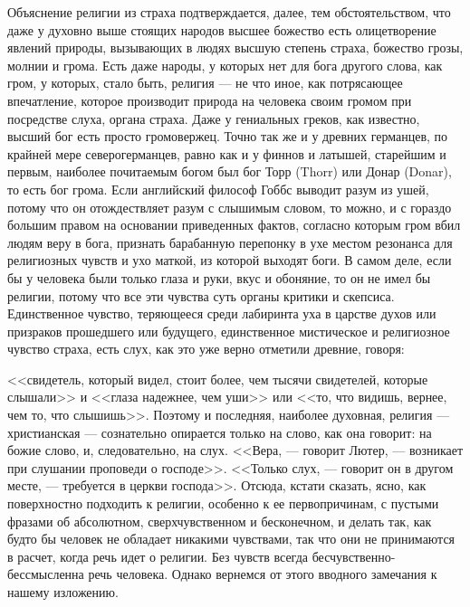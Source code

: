 \documentclass[12pt]{article}
\begin{document}
Объяснение религии из страха подтверждается, далее, тем обстоятельством, что даже у духовно выше стоящих народов высшее божество есть олицетворение явлений природы, вызывающих в людях высшую степень страха, божество грозы, молнии и грома. Есть даже народы, у которых нет для бога другого слова, как гром, у которых, стало быть, религия --- не что иное, как потрясающее впечатление, которое производит природа на человека своим громом при посредстве слуха, органа страха. Даже у гениальных греков, как известно, высший бог есть просто громовержец. Точно так же и у древних германцев, по крайней мере северогерманцев, равно как и у финнов и латышей, старейшим и первым, наиболее почитаемым богом был бог Торр (Thorr) или Донар (Donar), то есть бог грома. Если английский философ Гоббс выводит разум из ушей, потому что он отождествляет разум с слышимым словом, то можно, и с гораздо большим правом на основании приведенных фактов, согласно которым гром вбил людям веру в бога, признать барабанную перепонку в ухе местом резонанса для религиозных чувств и ухо маткой, из которой выходят боги. В самом деле, если бы у человека были только глаза и руки, вкус и обоняние, то он не имел бы религии, потому что все эти чувства суть органы критики и скепсиса. Единственное чувство, теряющееся среди лабиринта уха в царстве духов или призраков прошедшего или будущего, единственное мистическое и религиозное чувство страха, есть слух, как это уже верно отметили древние, говоря: 

<<свидетель, который видел, стоит более, чем тысячи свидетелей, которые слышали>>  и <<глаза надежнее, чем уши>>  или <<то, что видишь, вернее, чем то, что слышишь>>. Поэтому и последняя, наиболее духовная, религия --- христианская --- сознательно опирается только на слово, как она говорит: на божие слово, и, следовательно, на слух. <<Вера, --- говорит Лютер, --- возникает при слушании проповеди о господе>>. <<Только слух, --- говорит он в другом месте, --- требуется в церкви господа>>. Отсюда, кстати сказать, ясно, как поверхностно подходить к религии, особенно к ее первопричинам, с пустыми фразами об абсолютном, сверхчувственном и бесконечном, и делать так, как будто бы человек не обладает никакими чувствами, так что они не принимаются в расчет, когда речь идет о религии. Без чувств всегда бесчувственно-бессмысленна речь человека. Однако вернемся от этого вводного замечания к нашему изложению. 
\end{document}
